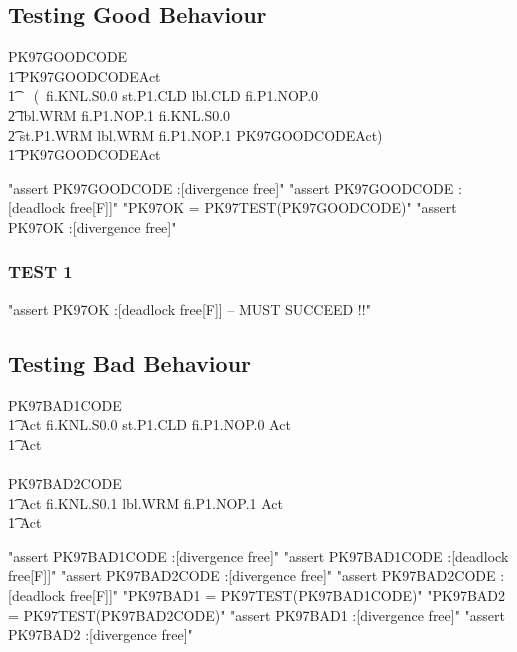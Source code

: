 \subsection{Testing Good Behaviour}
\begin{circus}
\circprocess PK97GOODCODE \circdef \circbegin\\
 \t1 PK97GOODCODEAct \circdef \\
  \t1 ~~(~fi.KNL.S0.0 \then st.P1.CLD \then lbl.CLD \then fi.P1.NOP.0 \\
  \t2       \then lbl.WRM \then fi.P1.NOP.1 \then fi.KNL.S0.0 \\
  \t2      \then st.P1.WRM \then lbl.WRM \then fi.P1.NOP.1
  \then PK97GOODCODEAct)\\
 \t1 \circspot PK97GOODCODEAct\\
\circend
\end{circus}
\begin{assert}
"assert PK97GOODCODE :[divergence free]"
\also "assert PK97GOODCODE :[deadlock free[F]]"
\also "PK97OK = PK97TEST(PK97GOODCODE)"
\also "assert PK97OK :[divergence free]"
\end{assert}
\subsubsection{TEST 1}
\begin{assert}
"assert PK97OK :[deadlock free[F]]  -- MUST SUCCEED !!"
\end{assert}

\subsection{Testing Bad Behaviour}
\begin{circus}
\circprocess PK97BAD1CODE \circdef \circbegin
\\ \t1 Act \circdef fi.KNL.S0.0 \then st.P1.CLD \then fi.P1.NOP.0 \then Act
\\ \t1 \circspot Act
\\ \circend
\\
\circprocess PK97BAD2CODE \circdef\circbegin
\\ \t1 Act \circdef fi.KNL.S0.1 \then lbl.WRM \then fi.P1.NOP.1 \then Act
\\ \t1  \circspot Act
\\ \circend
\end{circus}
\begin{assert}
"assert PK97BAD1CODE :[divergence free]"
\also "assert PK97BAD1CODE :[deadlock free[F]]"
\also "assert PK97BAD2CODE :[divergence free]"
\also "assert PK97BAD2CODE :[deadlock free[F]]"
\also "PK97BAD1 = PK97TEST(PK97BAD1CODE)"
\also "PK97BAD2 = PK97TEST(PK97BAD2CODE)"
\also "assert PK97BAD1 :[divergence free]"
\also "assert PK97BAD2 :[divergence free]"
\end{assert}
